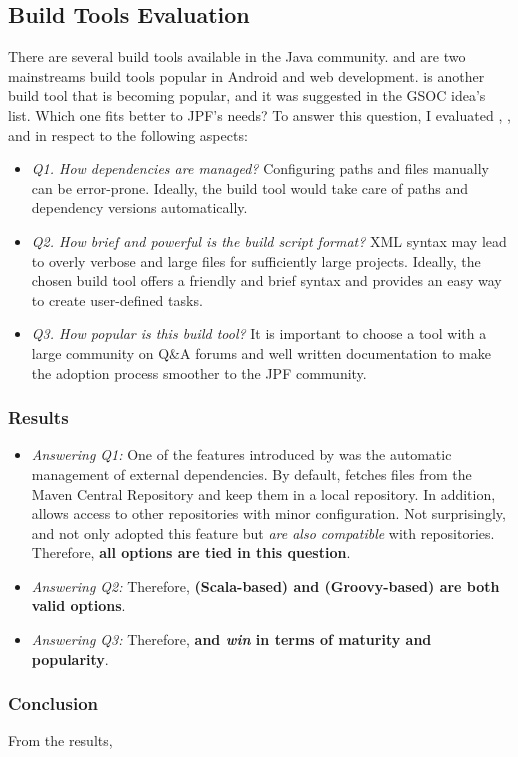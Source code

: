 \documentclass{article}
\begin{document}
\subsection{Build Tools Evaluation}
\label{sec:eval}

There are several build tools available in the Java community.
\maven{} and \gradle{} are two mainstreams build tools popular in Android and
web development.
\sbt{}\cite{page:sbt} is another build tool that is becoming popular, and it
was suggested in the GSOC idea's list\cite{page:jpf-gsoc18}.
Which one fits better to JPF's needs?
To answer this question, I evaluated \maven{}, \gradle{}, and \sbt{} in respect
to the following aspects:

\begin{itemize}
\item \emph{Q1. How dependencies are managed?} Configuring paths and \jar{}
files manually can be error-prone. Ideally, the build tool would take care of
paths and dependency versions automatically.
\item \emph{Q2. How brief and powerful is the build script format?} XML syntax
may lead to overly verbose and large files for sufficiently large projects.
Ideally, the chosen build tool offers a friendly and brief syntax and provides
an easy way to create user-defined tasks.
\item \emph{Q3. How popular is this build tool?} It is important to choose a
tool with a large community on Q\&A forums and well written documentation to
make the adoption process smoother to the JPF community.
\end{itemize}

\subsubsection*{Results}
\label{sec:results}

\begin{itemize}
\item \emph{Answering Q1:}
One of the features introduced by \maven{} was the automatic management of
external dependencies.
By default, \maven{} fetches \jar{} files from the Maven Central
Repository\cite{page:mvncentral} and keep them in a local repository.
In addition, \maven{} allows access to other repositories\cite{page:mvnrepo}
with minor configuration.
Not surprisingly, \gradle{} and \sbt{} not only adopted this feature but
\emph{are also compatible} with \maven{} repositories.
Therefore, \textbf{all options are tied in this question}.

\item \emph{Answering Q2:}
Therefore, \textbf{\sbt{} (Scala-based) and \gradle{} (Groovy-based) are both
valid options}.

\item \emph{Answering Q3:}
Therefore, \textbf{\maven{} and \gradle{} \emph{win} in terms of maturity and
popularity}.
\end{itemize}

\subsubsection*{Conclusion}
From the results, 

\clearpage


\end{document}
